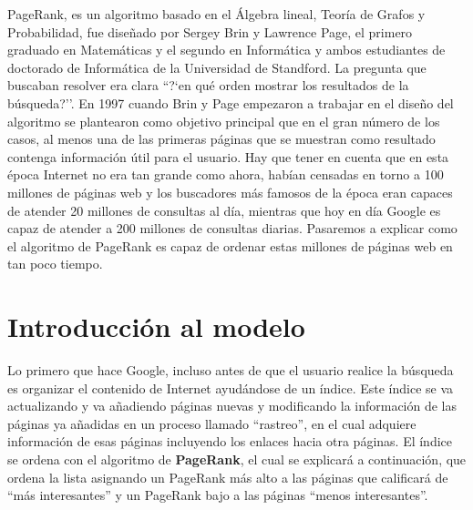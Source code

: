 \documentclass[size=a4, parskip=half, titlepage=false, toc=flat, toc=bib, 12pt]{scrartcl}
\theoremstyle{theorem-style}
\theoremstyle{definition-style}
\theoremstyle{remark-style}
\theoremstyle{example-style}
\theoremstyle{definition-style}
\theoremstyle{remark-style}
\begin{document}
PageRank, es un algoritmo basado en el Álgebra lineal, Teoría de Grafos y Probabilidad, fue diseñado por Sergey Brin y Lawrence Page, el primero graduado en Matemáticas y el segundo en Informática y ambos estudiantes de doctorado de Informática de la Universidad de Standford. La pregunta que buscaban resolver era clara ``?`en qué orden mostrar los resultados de la búsqueda?''. En 1997 cuando Brin y Page empezaron a trabajar en el diseño del algoritmo se plantearon como objetivo principal que en el gran número de los casos, al menos una de las primeras páginas que se muestran como resultado contenga información útil para el usuario. Hay que tener en cuenta que en esta época Internet no era tan grande como ahora, habían censadas en torno a 100 millones de páginas web y los buscadores más famosos de la época eran capaces de atender 20 millones de consultas al día, mientras que hoy en día Google es capaz de atender a 200 millones de consultas diarias. Pasaremos a explicar como el algoritmo de PageRank es capaz de ordenar estas millones de páginas web en tan poco tiempo.

\section{Introducción al modelo}
Lo primero que hace Google, incluso antes de que el usuario realice la búsqueda es organizar el contenido de Internet ayudándose de un índice. Este índice se va actualizando y va añadiendo páginas nuevas y modificando la información de las páginas ya añadidas en un proceso llamado ``rastreo'', en el cual adquiere información de esas páginas incluyendo los enlaces hacia otra páginas. El índice se ordena con el algoritmo de \textbf{PageRank}, el cual se explicará a continuación, que ordena la lista asignando un PageRank más alto a las páginas que calificará de ``más interesantes'' y un PageRank bajo a las páginas ``menos interesantes''.
\end{document}
